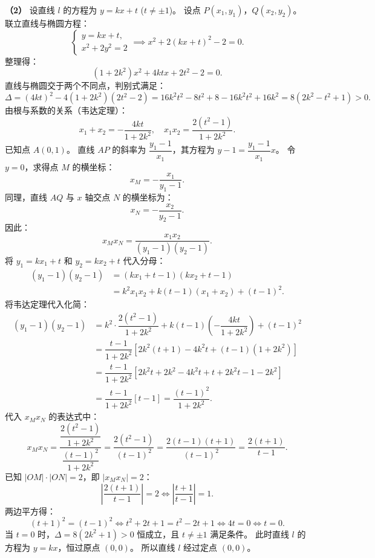 \begin{answer}
\textbf{（2）}
设直线 $l$ 的方程为 $y = kx + t$ ($t \neq \pm 1$)。
设点 $P(x_1, y_1)$，$Q(x_2, y_2)$。
联立直线与椭圆方程：
\nopagebreak[4]
\[\begin{cases} y = kx + t, \\ x^2 + 2y^2 = 2 \end{cases} \implies x^2 + 2(kx + t)^2 - 2 = 0.\]
整理得：
\nopagebreak[4]
\[(1 + 2k^2)x^2 + 4ktx + 2t^2 - 2 = 0.\]
直线与椭圆交于两个不同点，判别式满足：
\nopagebreak[4]
\[\Delta = (4kt)^2 - 4(1 + 2k^2)(2t^2 - 2) = 16k^2t^2 - 8t^2 + 8 - 16k^2t^2 + 16k^2 = 8(2k^2 - t^2 + 1) > 0.\]
由根与系数的关系（韦达定理）：
\nopagebreak[4]
\[x_1 + x_2 = -\dfrac{4kt}{1 + 2k^2}, \quad x_1 x_2 = \dfrac{2(t^2 - 1)}{1 + 2k^2}.\]
已知点 $A(0, 1)$。
直线 $AP$ 的斜率为 $\dfrac{y_1 - 1}{x_1}$，其方程为 $y - 1 = \dfrac{y_1 - 1}{x_1} x$。
令 $y = 0$，求得点 $M$ 的横坐标：
\nopagebreak[4]
\[x_M = -\dfrac{x_1}{y_1 - 1}.\]
同理，直线 $AQ$ 与 $x$ 轴交点 $N$ 的横坐标为：
\nopagebreak[4]
\[x_N = -\dfrac{x_2}{y_2 - 1}.\]
因此：
\nopagebreak[4]
\[x_M x_N = \dfrac{x_1 x_2}{(y_1 - 1)(y_2 - 1)}.\]
将 $y_1 = kx_1 + t$ 和 $y_2 = kx_2 + t$ 代入分母：
\nopagebreak[4]
\[\begin{aligned}
(y_1 - 1)(y_2 - 1) &= (kx_1 + t - 1)(kx_2 + t - 1) \\
&= k^2 x_1 x_2 + k(t - 1)(x_1 + x_2) + (t - 1)^2.
\end{aligned}\]
将韦达定理代入化简：
\nopagebreak[4]
\[\begin{aligned}
(y_1 - 1)(y_2 - 1) &= k^2 \cdot \dfrac{2(t^2 - 1)}{1 + 2k^2} + k(t - 1) \left(-\dfrac{4kt}{1 + 2k^2}\right) + (t - 1)^2 \\
&= \dfrac{t - 1}{1 + 2k^2} \left[ 2k^2(t + 1) - 4k^2 t + (t - 1)(1 + 2k^2) \right] \\
&= \dfrac{t - 1}{1 + 2k^2} \left[ 2k^2 t + 2k^2 - 4k^2 t + t + 2k^2 t - 1 - 2k^2 \right] \\
&= \dfrac{t - 1}{1 + 2k^2} [ t - 1 ] = \dfrac{(t - 1)^2}{1 + 2k^2}.
\end{aligned}\]
代入 $x_M x_N$ 的表达式中：
\nopagebreak[4]
\[x_M x_N = \dfrac{\dfrac{2(t^2 - 1)}{1 + 2k^2}}{\dfrac{(t - 1)^2}{1 + 2k^2}} = \dfrac{2(t^2 - 1)}{(t - 1)^2} = \dfrac{2(t - 1)(t + 1)}{(t - 1)^2} = \dfrac{2(t + 1)}{t - 1}.\]
已知 $|OM| \cdot |ON| = 2$，即 $|x_M x_N| = 2$：
\nopagebreak[4]
\[\left|\dfrac{2(t + 1)}{t - 1}\right| = 2 \iff \left|\dfrac{t + 1}{t - 1}\right| = 1.\]
两边平方得：
\nopagebreak[4]
\[(t + 1)^2 = (t - 1)^2 \iff t^2 + 2t + 1 = t^2 - 2t + 1 \iff 4t = 0 \iff t = 0.\]
当 $t = 0$ 时，$\Delta = 8(2k^2 + 1) > 0$ 恒成立，且 $t \neq \pm 1$ 满足条件。
此时直线 $l$ 的方程为 $y = kx$，恒过原点 $(0, 0)$。
所以直线 $l$ 经过定点 $(0, 0)$。



\end{answer}
